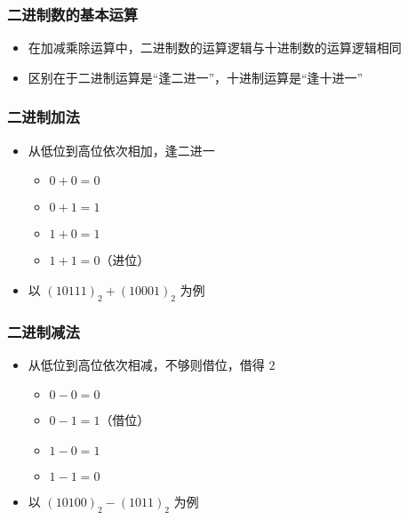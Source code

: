 \begin{frame}[fragile]
    \frametitle{二进制数的基本运算}

    \begin{itemize}[<+->]
        \item 在加减乘除运算中，二进制数的运算逻辑与十进制数的运算逻辑相同
        \item 区别在于二进制运算是“逢二进一”，十进制运算是“逢十进一”
    \end{itemize}

\end{frame}

\begin{frame}[fragile]
    \frametitle{二进制加法}

    \begin{itemize}
        \item 从低位到高位依次相加，逢二进一
        \begin{itemize}
            \item $0 + 0 = 0$
            \item $0 + 1 = 1$
            \item $1 + 0 = 1$
            \item $1 + 1 = 0$（进位）
        \end{itemize}
        \item<2-> 以 $(10111)_2 + (10001)_2$ 为例

    \end{itemize}

\end{frame}

\begin{frame}[fragile]
    \frametitle{二进制减法}

    \begin{itemize}
        \item 从低位到高位依次相减，不够则借位，借得 $2$
        \begin{itemize}
            \item $0 - 0 = 0$
            \item $0 - 1 = 1$（借位）
            \item $1 - 0 = 1$
            \item $1 - 1 = 0$
        \end{itemize}
        \item<2-> 以 $(10100)_2 - (1011)_2$ 为例

    \end{itemize}

\end{frame}

